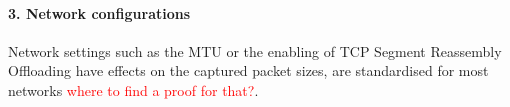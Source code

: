 \documentclass[sigconf]{acmart}
\begin{document}
\paragraph{3. Network configurations}
Network settings such as the MTU or the enabling of TCP Segment Reassembly Offloading have effects on the captured packet sizes, are standardised for most networks \textcolor{red}{where to find a proof for that?}.








%
%
%
%
%
%
%
%
%
%
%
\end{document}
